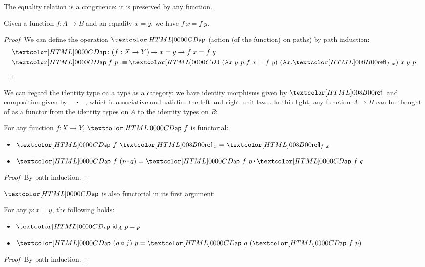 The equality relation is a congruence: it is preserved by any function.

\begin{proposition}
  Given a function $f : A \to B$ and an equality $x = y$, we have
  $f\ x = f\ y$.
\end{proposition}

\begin{proof}
  We can define the operation $\ap$ (action (of the function) on
  paths) by path induction:
  \begin{align*}
    &\ap : (f : X \to Y) \to x = y \to f\ x = f\ y \\
    &\ap\ f\ p \ddefeq \J\ (\lambda x\ y\ p . f\ x = f\ y)\ (\lambda x . \refl_{f\ x})\ x\ y\ p
  \end{align*}
\end{proof}

We can regard the identity type on a type as a category: we have
identity morphisms given by $\refl$ and composition given by
$\trans{\_}{\_}$, which is associative and satisfies the left and
right unit laws. In this light, any function $A \to B$ can be thought
of as a functor from the identity types on $A$ to the identity types
on $B$:

\begin{proposition}
  For any function $f : X \to Y$, $\ap\ f$ is functorial:
  \begin{itemize}
  \item $\ap\ f\ \refl_x = \refl_{f\ x}$
  \item $\ap\ f\ (\trans{p}{q}) = \trans{\ap\ f\ p}{\ap\ f\ q}$
  \end{itemize}
\end{proposition}

\begin{proof}
  By path induction.
\end{proof}

$\ap$ is also functorial in its first argument:

\begin{proposition}
  For any $p : x = y$, the following holds:
  \begin{itemize}
  \item $\ap\ \id_A\ p = p$
  \item $\ap\ (g \circ f)\ p = \ap\ g\ (\ap\ f\ p)$
  \end{itemize}
\end{proposition}

\begin{proof}
  By path induction.
\end{proof}

